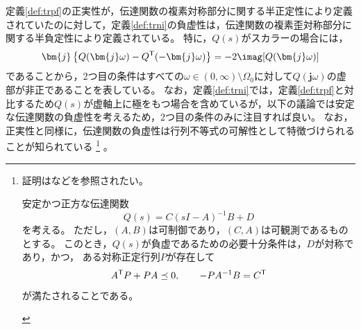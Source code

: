 \documentclass[tombow,dvipdfmx]{corona-a5-1.1}
\begin{document}
定義\ref{def:trpf}の正実性が，伝達関数の複素対称部分に関する半正定性により定義されていたのに対して，定義\ref{def:trni}の負虚性は，伝達関数の複素歪対称部分に関する半負定性により定義されている。
特に，$Q(s)$がスカラーの場合には，
\begin{align*}
\bm{j}\left\{Q(\bm{j} \omega) - Q^{\sf T}(-\bm{j} \omega) \right\}
= -2 \imag[Q(\bm{j} \omega)]
\end{align*}
であることから，2つ目の条件はすべての$\omega \in (0,\infty)\setminus \Omega_0$に対して$Q(\bm{j}\omega)$の虚部が非正であることを表している。
なお，定義\ref{def:trni}では，定義\ref{def:trpf}と対比するため$Q(s)$が虚軸上に極をもつ場合を含めているが，以下の議論では安定な伝達関数の負虚性を考えるため，2つ目の条件のみに注目すれば良い。
なお，正実性と同様に，伝達関数の負虚性は行列不等式の可解性として特徴づけられることが知られている
\footnote{
証明は\cite[Lemma 7]{xiong2010negative}などを参照されたい。
\begin{補題*}
安定かつ正方な伝達関数
\[
Q(s)=C(sI-A)^{-1}B + D
\]
を考える。
ただし，$(A,B)$は可制御であり，$(C,A)$は可観測であるものとする。
このとき，$Q(s)$が負虚であるための必要十分条件は，$D$が対称であり，かつ，
ある対称正定行列$P$が存在して
\begin{align*}
A^{\sf T}P+PA \preceq 0
,\qquad
-PA^{-1}B = C^{\sf T}
\end{align*}
が満たされることである。
\end{補題*}
}
。
\end{document}
